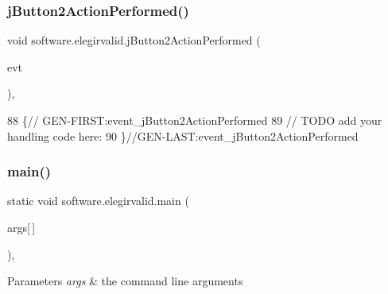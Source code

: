 \mbox{\label{classsoftware_1_1elegirvalid_a65e2a0fb21c23474d57dba8d86811782}} 
\subsubsection{\texorpdfstring{j\+Button2\+Action\+Performed()}{jButton2ActionPerformed()}}
{\footnotesize\ttfamily void software.\+elegirvalid.\+j\+Button2\+Action\+Performed (\begin{DoxyParamCaption}\item[{java.\+awt.\+event.\+Action\+Event}]{evt }\end{DoxyParamCaption})\hspace{0.3cm}{\ttfamily [inline]}, {\ttfamily [private]}}


\begin{DoxyCode}
88                                                                          \{\textcolor{comment}{//
      GEN-FIRST:event\_jButton2ActionPerformed}
89         \textcolor{comment}{// TODO add your handling code here:}
90     \}\textcolor{comment}{//GEN-LAST:event\_jButton2ActionPerformed}
\end{DoxyCode}
\mbox{\label{classsoftware_1_1elegirvalid_a186a61a4379c8e9572d90605f1fa2f77}} 
\subsubsection{\texorpdfstring{main()}{main()}}
{\footnotesize\ttfamily static void software.\+elegirvalid.\+main (\begin{DoxyParamCaption}\item[{String}]{args\mbox{[}$\,$\mbox{]} }\end{DoxyParamCaption})\hspace{0.3cm}{\ttfamily [inline]}, {\ttfamily [static]}}


\begin{DoxyParams}{Parameters}
{\em args} & the command line arguments \\
\hline
\end{DoxyParams}

